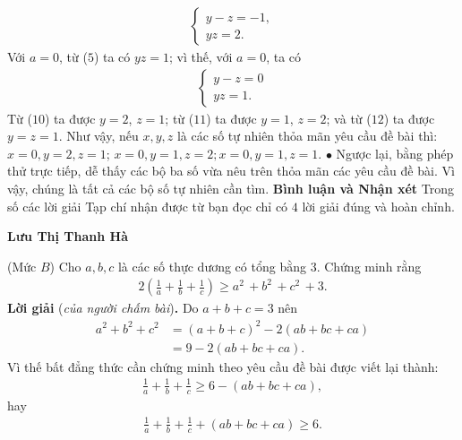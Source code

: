 \begin{multicols}{2}
	\begin{align*}
		\begin{cases}
			y-z = -1,\\[-0.5ex]
			yz = 2. \tag{$11$}
		\end{cases}
	\end{align*}
	Với  $a = 0$, từ ($5$) ta có $yz=1$; vì thế, với $a= 0$, ta có
	\begin{align*}
		\begin{cases}
			y-z = 0\\[-0.5ex]
			yz = 1. \tag{$12$}
		\end{cases}
	\end{align*}
	Từ ($10$) ta được $y= 2$, $z= 1$; từ ($11$) ta được $y= 1$, $z= 2$; và từ ($12$) ta được $y=z=1$.
	\vskip 0.05cm
	Như vậy, nếu $x, y, z$ là các số tự nhiên thỏa mãn yêu cầu đề bài thì: $x\!=\! 0, y\!=\! 2, z\!=\! 1$; $x= 0, y= 1, z= 2; x= 0, y= 1, z= 1$.
	\vskip 0.05cm
	$\bullet$ Ngược lại, bằng phép thử trực tiếp, dễ thấy các bộ ba số vừa nêu trên thỏa mãn các yêu cầu đề bài. Vì vậy, chúng là tất cả các bộ số tự nhiên cần tìm.
	\vskip 0.05cm
	\textbf{\color{thachthuctoanhoc}Bình luận và Nhận xét}
	\vskip 0.05cm
	Trong số các lời giải Tạp chí nhận được từ bạn đọc chỉ có $4$ lời giải đúng và hoàn chỉnh.
	\begin{flushright}
		\textbf{\color{thachthuctoanhoc}Lưu Thị Thanh Hà}
	\end{flushright}
	{}
	(Mức $B$) Cho $a, b, c$ là các số thực dương có tổng bằng $3$. Chứng minh rằng
	\begin{align*}
		2\left( {\frac{1}{a} + \frac{1}{b} + \frac{1}{c}} \right) \ge {a^2}\, + {b^2}\, + {c^2}\, + 3.
	\end{align*}
	\textbf{\color{thachthuctoanhoc}Lời giải} (\textit{của người chấm bài})\textbf{\color{thachthuctoanhoc}.}
	\vskip 0.05cm
	Do $a+b+c= 3$ nên
	\begin{align*}
		{a^2}\! +\! {b^2}\! +\! {c^2} &= {\left( {a \!+\! b \!+\! c} \right)^2}\! -\! 2\left( {ab \!+\! bc \!+\! ca} \right) \\[-0.5ex]
		&= 9 - 2\left( {ab + bc + ca} \right).
	\end{align*}
	Vì thế bất đẳng thức cần chứng minh theo yêu cầu đề bài được viết lại thành:
	\begin{align*}
		\frac{1}{a} + \frac{1}{b} + \frac{1}{c} \ge 6 - \left( {ab + bc + ca} \right),
	\end{align*}
	hay
	\begin{align*}
		\frac{1}{a} + \frac{1}{b} + \frac{1}{c} + \left( {ab + bc + ca} \right) \ge 6. \tag{$1$}

\end{align*}
\end{multicols}
